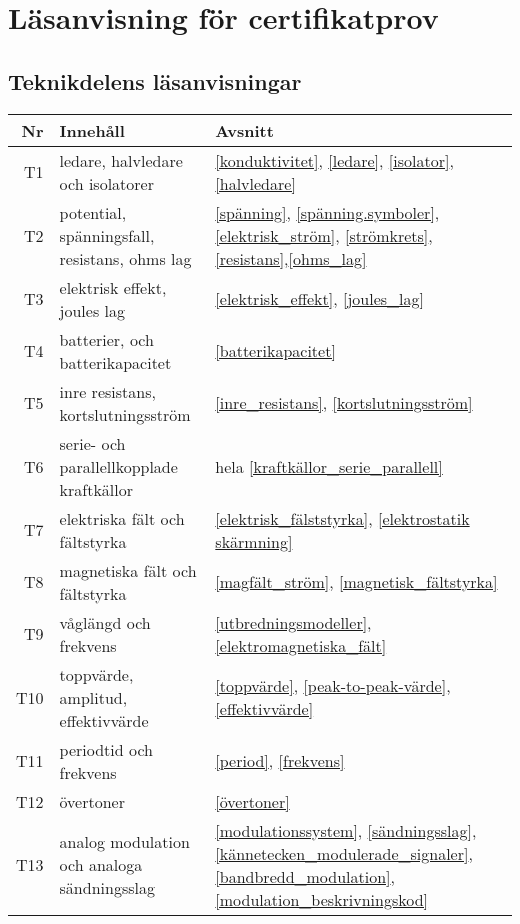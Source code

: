 \onecolumn

\chapter{Läsanvisning för certifikatprov}

\section{Teknikdelens läsanvisningar}


\begin{table}[H]
	\small
\begin{tabular}{rll}
\textbf{Nr} & \textbf{Innehåll} & \textbf{Avsnitt}\\ \hline\hline
T1 & ledare, halvledare och isolatorer & 
\ref{konduktivitet}, \ref{ledare}, \ref{isolator}, \ref{halvledare}\\ \hline
T2 & potential, spänningsfall, resistans, ohms lag &
\ref{spänning}, \ref{spänning.symboler}, \ref{elektrisk_ström}, \ref{strömkrets}, \ref{resistans},\ref{ohms_lag}\\ \hline
T3 & elektrisk effekt, joules lag &
\ref{elektrisk_effekt}, \ref{joules_lag}\\ \hline
T4 & batterier, och batterikapacitet & 
\ref{batterikapacitet}\\ \hline
T5 & inre resistans, kortslutningsström & 
\ref{inre_resistans}, \ref{kortslutningsström}\\ \hline
T6 & serie- och parallellkopplade kraftkällor &
hela \ref{kraftkällor_serie_parallell}\\ \hline
T7 & elektriska fält och fältstyrka &
\ref{elektrisk_fälststyrka}, \ref{elektrostatik skärmning}\\ \hline
T8 & magnetiska fält och fältstyrka &
\ref{magfält_ström}, \ref{magnetisk_fältstyrka}\\ \hline
T9 & våglängd och frekvens &
\ref{utbredningsmodeller}, \ref{elektromagnetiska_fält}\\ \hline
T10 & toppvärde, amplitud, effektivvärde &
\ref{toppvärde}, \ref{peak-to-peak-värde}, \ref{effektivvärde}\\ \hline
T11 & periodtid och frekvens&
\ref{period}, \ref{frekvens}\\ \hline
T12 & övertoner &
\ref{övertoner}\\ \hline
T13 & analog modulation och analoga sändningsslag&
\ref{modulationssystem}, \ref{sändningsslag}, \ref{kännetecken_modulerade_signaler}, 
\ref{bandbredd_modulation},  \ref{modulation_beskrivningskod}\\

\end{tabular}
\end{table}
